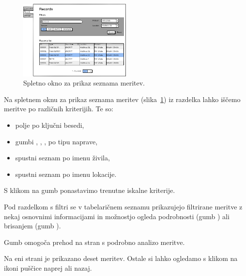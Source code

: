 \documentclass[a4paper, 12pt]{book}
\begin{document}
\begin{figure}[h]
\begin{center}
\includegraphics[width=0.5\textwidth]{slike/Records.png}
\end{center}
\caption{Spletno okno za prikaz seznama meritev.}
\label{records-wireframe}
\end{figure}

Na spletnem oknu za prikaz seznama meritev (slika~\ref{records-wireframe}) iz razdelka  lahko iščemo meritve po različnih kriterijih. Te so:
\begin{itemize}
	\item polje  po ključni besedi,
	\item gumbi , , ,  po tipu naprave,
	\item spustni seznam  po imenu živila,
	\item spustni seznam  po imenu lokacije.  
\end{itemize}

S klikom na gumb  ponastavimo trenutne iskalne kriterije.


Pod razdelkom s filtri se v tabelaričnem seznamu prikazujejo filtrirane meritve z nekaj osnovnimi informacijami in možnostjo ogleda podrobnosti (gumb ) ali brisanjem (gumb ).

Gumb  omogoča prehod na stran s podrobno analizo meritve.

Na eni strani je prikazano deset meritev. Ostale si lahko ogledamo s klikom na ikoni puščice naprej ali nazaj.

\clearpage
\end{document}
